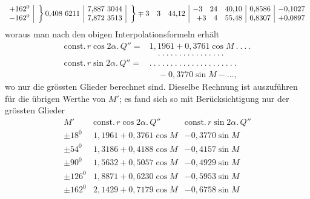 \[\begin{array}{r|c|r|c|r|r|r}
\begin{array}{@{}r@{}}+162^{0}\\-162^{0}\end{array}&\left.\vphantom{\begin{array}{c}0\\0\end{array}}\right\}0{,}408\ 6211&\begin{array}{@{}r@{}}7{,}887\ 3044\\7{,}872\ 3513\end{array}&\left.\vphantom{\begin{array}{c}0\\0\end{array}}\right\}\mp3\quad3\quad44{,}12&\begin{array}{@{}r@{}}-3\quad24\quad40{,}10\\+3\quad4\quad55{,}48\end{array}&\begin{array}{@{}r@{}}0{,}8586\\0{,}8307\end{array}&\begin{array}{@{}r@{}}-0{,}1027\\+0{,}0897\end{array}
\end{array}
\]
\endgroup
woraus man nach den obigen Interpolationsformeln erhält
\[
\begin{aligned}
\mathrm{const.}\,r\cos2\alpha.\,Q''={}&1{,}1961+0{,}3761\cos M\ .\ .\ .\ .\\
&\quad .\ .\ .\ .\ .\ .\ .\ .\ .\ .\ .\ .\ .\ .\ .\ .\\
\mathrm{const.}\,r\sin2\alpha.\,Q''={}&.\ .\ .\ .\ .\ .\ .\ .\ .\ .\ .\ .\ .\ .\ .\ .\ .\ .\ .\ .\ .\\
&\quad-0{,}3770\sin M-\ldots,
\end{aligned}
\]
wo nur die grössten Glieder berechnet sind. Dieselbe Rechnung ist auszuführen für die übrigen Werthe von \(M'\); es fand sich so mit Berücksichtigung nur der grössten Glieder
\[
\begin{array}{r|l|l}
M'&\mathrm{const.}\,r\cos2\alpha.\,Q''&\mathrm{const.}\,r\sin2\alpha.\,Q''\\\hline
\pm18^{0}&1{,}1961+0{,}3761\cos M&-0{,}3770\sin M\\
\pm54^{0}&1{,}3186+0{,}4188\cos M&-0{,}4157\sin M\\
\pm90^{0}&1{,}5632+0{,}5057\cos M&-0{,}4929\sin M\\
\pm126^{0}&1{,}8871+0{,}6230\cos M&-0{,}5953\sin M\\
\pm162^{0}&2{,}1429+0{,}7179\cos M&-0{,}6758\sin M
\end{array}
\]
